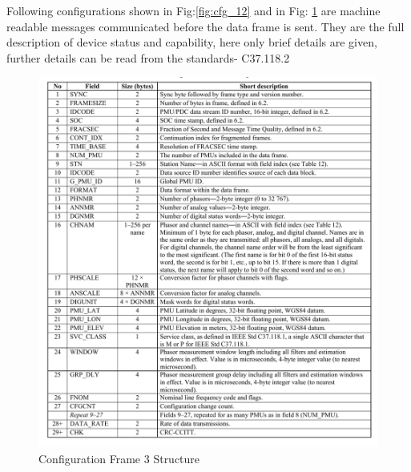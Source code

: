 \begin{appendix}
Following configurations shown in Fig:\ref{fig:cfg_12} and in Fig: \ref{fig:cfg_3} are machine readable messages communicated before the data frame is sent. They are the full description of device status and capability, here only brief details are given, further details can be read from the standards- C37.118.2   
\begin{figure}[h]
	\includegraphics[width=\textwidth]{fig/cfg_frame3.png}
	\caption{Configuration Frame 3 Structure \cite{c37.118.2}}
	\label{fig:cfg_3}
\end{figure} 


\end{appendix}
